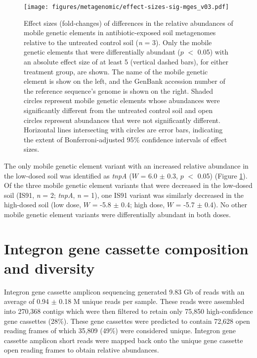 \begin{figure}[htpb]
	\centering
		\texttt{[image: figures/metagenomic/effect-sizes-sig-mges\_v03.pdf]}
	\caption[Effect sizes of differentially abundant metagenomic mobile genetic elements.]{
		Effect sizes (fold-changes) of differences in the relative abundances of mobile genetic elements in antibiotic-exposed soil metagenomes relative to the untreated control soil (\textit{n} = 3).
		Only the mobile genetic elements that were differentially abundant ($p$ $<$ 0.05) with an absolute effect size of at least 5 (vertical dashed bars), for either treatment group, are shown.
		The name of the mobile genetic element is show on the left, and the GenBank accession number of the reference sequence's genome is shown on the right.
		Shaded circles represent mobile genetic elements whose abundances were significantly different from the untreated control soil and open circles represent abundances that were not significantly different.
		Horizontal lines intersecting with circles are error bars, indicating the extent of Bonferroni-adjusted 95\% confidence intervals of effect sizes.
	}
	\label{fig:effect-sizes-sig-mges}
\end{figure}

The only mobile genetic element variant with an increased relative abundance in the low-dosed soil was identified as \textit{tnpA} ($W$ = 6.0 $\pm$ 0.3, $p$ $<$ 0.05) (Figure \ref{fig:effect-sizes-sig-mges}).
Of the three mobile genetic element variants that were decreased in the low-dosed soil (IS91, \textit{n} = 2; \textit{tnpA}, \textit{n} = 1), one IS91 variant was similarly decreased in the high-dosed soil (low dose, $W$ = -5.8 $\pm$ 0.4; high dose, $W$ = -5.7 $\pm$ 0.4).
No other mobile genetic element variants were differentially abundant in both doses.

\section{Integron gene cassette composition and diversity}

Integron gene cassette amplicon sequencing generated 9.83 Gb of reads with an average of 0.94 $\pm$ 0.18 M unique reads per sample.
These reads were assembled into 270,368 contigs which were then filtered to retain only 75,850 high-confidence gene cassettes (28\%).
These gene cassettes were predicted to contain 72,628 open reading frames of which 35,809 (49\%) were considered unique.
Integron gene cassette amplicon short reads were mapped back onto the unique gene cassette open reading frames to obtain relative abundances.

